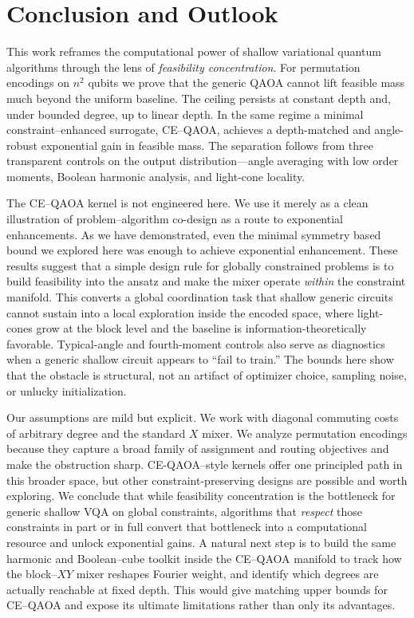 \documentclass[a4paper,onecolumn,11pt,unpublished]{quantumarticle}
\theoremstyle{remark}
\begin{document}
\section{Conclusion and Outlook}
\label{sec:conclusion}

This work reframes the computational power of shallow variational quantum algorithms through the lens of \emph{feasibility concentration}. For permutation encodings on \(n^2\) qubits we prove that the generic QAOA cannot lift feasible mass much beyond the uniform baseline. The ceiling persists at constant depth and, under bounded degree, up to linear depth. In the same regime a minimal constraint–enhanced surrogate, CE–QAOA, achieves a depth-matched and angle-robust exponential gain in feasible mass. The separation follows from three transparent controls on the output distribution—angle averaging with low order moments, Boolean harmonic analysis, and light-cone locality. 

The CE–QAOA kernel is not engineered here. We use it merely as a clean illustration of problem–algorithm co-design as a route to exponential enhancements. As we have demonstrated, even the minimal symmetry based bound we explored here was enough to achieve exponential enhancement. These results suggest that a simple design rule for globally constrained problems is to build feasibility into the ansatz and make the mixer operate \emph{within} the constraint manifold. This converts a global coordination task that shallow generic circuits cannot sustain into a local exploration inside the encoded space, where light-cones grow at the block level and the baseline is information-theoretically favorable. Typical-angle and fourth-moment controls also serve as diagnostics when a generic shallow circuit appears to “fail to train.” The bounds here show that the obstacle is structural, not an artifact of optimizer choice, sampling noise, or unlucky initialization.

Our assumptions are mild but explicit. We work with diagonal commuting costs of arbitrary degree and the standard \(X\) mixer. We analyze permutation encodings because they capture a broad family of assignment and routing objectives and make the obstruction sharp. CE-QAOA–style kernels offer one principled path in this broader space, but other constraint-preserving designs are possible and worth exploring. We conclude that while feasibility concentration is the bottleneck for generic shallow VQA on global constraints, algorithms that \emph{respect} those constraints in part or in full convert that bottleneck into a computational resource and unlock exponential gains. A natural next step is to build the same harmonic and Boolean–cube toolkit inside the CE–QAOA manifold to track how the block–$XY$ mixer reshapes Fourier weight, and identify which degrees are actually reachable at fixed depth. This would give matching upper bounds for CE–QAOA and expose its ultimate limitations rather than only its advantages.
\end{document}
